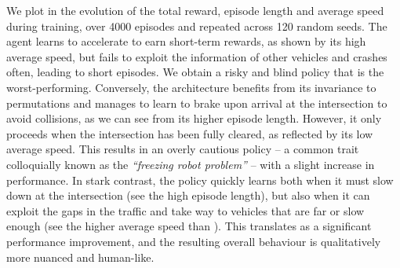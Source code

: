 We plot in  the evolution of the total reward, episode length and average speed during training, over 4000 episodes and repeated across 120 random seeds.
The \MLPL agent learns to accelerate to earn short-term rewards, as shown by its high average speed, but fails to exploit the information of other vehicles and crashes often, leading to short episodes. We obtain a risky and blind policy that is the worst-performing.
Conversely, the \CNNG architecture benefits from its invariance to permutations and manages to learn to brake upon arrival at the intersection to avoid collisions, as we can see from its higher episode length. However, it only proceeds when the intersection has been fully cleared, as reflected by its low average speed. This results in an overly cautious policy -- a common trait colloquially known as the \emph{\enquote{freezing robot problem}} \citep{Trautman2010} -- with a slight increase in performance.
In stark contrast, the \EgoAtt policy quickly learns both when it must slow down at the intersection (see the high episode length), but also when it can exploit the gaps in the traffic and take way to vehicles that are far or slow enough (see the higher average speed than \CNNG). This translates as a significant performance improvement, and the resulting overall behaviour is qualitatively more nuanced and human-like.

